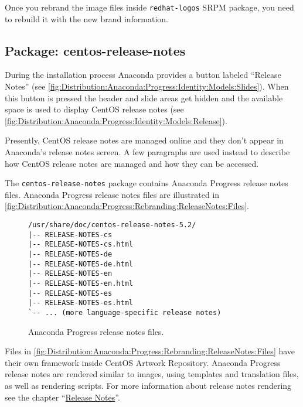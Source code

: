 Once you rebrand the image files inside \texttt{redhat-logos} SRPM
package, you need to rebuild it with the new brand information.

\subsection{Package: centos-release-notes} 

During the installation process Anaconda provides a button labeled
``Release Notes'' (see
\autoref{fig:Distribution:Anaconda:Progress:Identity:Models:Slides}).
When this button is pressed the header and slide areas get hidden and
the available space is used to display CentOS release notes (see
\autoref{fig:Distribution:Anaconda:Progress:Identity:Models:Release}).

Presently, CentOS release notes are managed online and they don't
appear in Anaconda's release notes screen. A few paragraphs are used
instead to describe how CentOS release notes are managed and how they
can be accessed.

The \texttt{centos-release-notes} package contains Anaconda Progress
release notes files. Anaconda Progress release notes files are
illustrated in \autoref{fig:Distribution:Anaconda:Progress:Rebranding:ReleaseNotes:Files}.

\begin{figure}[!hbp]
\hrulefill
\begin{verbatim}
/usr/share/doc/centos-release-notes-5.2/
|-- RELEASE-NOTES-cs
|-- RELEASE-NOTES-cs.html
|-- RELEASE-NOTES-de
|-- RELEASE-NOTES-de.html
|-- RELEASE-NOTES-en
|-- RELEASE-NOTES-en.html
|-- RELEASE-NOTES-es
|-- RELEASE-NOTES-es.html
`-- ... (more language-specific release notes)
\end{verbatim}
\hrulefill
\caption{Anaconda Progress release notes files.%
   \label{fig:Distribution:Anaconda:Progress:Rebranding:ReleaseNotes:Files}}
\end{figure}

Files in
\autoref{fig:Distribution:Anaconda:Progress:Rebranding:ReleaseNotes:Files}
have their own framework inside CentOS Artwork Repository. Anaconda
Progress release notes are rendered similar to images, using templates
and translation files, as well as rendering scripts.  For more
information about release notes rendering see the chapter
``\hyperlink{cha:Distribution:ReleaseNotes}{Release Notes}''.
